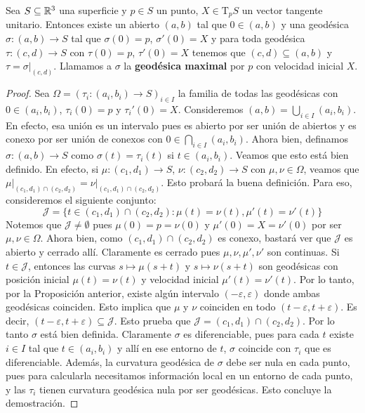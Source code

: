 \begin{prop}
Sea $S\subseteq\mathbb{R}^3$ una superficie y $p\in S$ un punto, $X\in\mathrm{T}_pS$ un vector tangente unitario. Entonces existe un abierto $(a,b)$ tal que $0\in (a,b)$ y una geodésica $\sigma:(a,b)\to S$ tal que $\sigma(0)=p$, $\sigma'(0)=X$ y para toda geodésica $\tau:(c,d)\to S$ con $\tau(0)=p$, $\tau'(0)=X$ tenemos que $(c,d)\subseteq (a,b)$ y $\tau=\left.\sigma\right\rvert_{(c,d)}$. Llamamos a $\sigma$ la \textbf{geodésica maximal} por $p$ con velocidad inicial $X$.
\begin{proof}
Sea $\Omega = (\tau_i : (a_i,b_i)\to S)_{i\in I}$ la familia de todas las geodésicas con $0\in (a_i,b_i)$, $\tau_i(0)=p$ y $\tau_i'(0)=X$. Consideremos $(a,b)=\displaystyle\bigcup_{i\in I}(a_i,b_i)$. En efecto, esa unión es un intervalo pues es abierto por ser unión de abiertos y es conexo por ser unión de conexos con $0\in\displaystyle\bigcap_{i\in I}(a_i,b_i)$. Ahora bien, definamos $\sigma:(a,b)\to S$ como $\sigma(t)=\tau_i(t)$ si $t\in(a_i,b_i)$. Veamos que esto está bien definido. En efecto, si $\mu:(c_1,d_1)\to S$, $\nu:(c_2,d_2)\to S$ con $\mu,\nu\in\Omega$, veamos que $\left.\mu\right\rvert_{(c_1,d_1)\cap(c_2,d_2)}=\left.\nu\right\rvert_{(c_1,d_1)\cap (c_2,d_2)}$. Esto probará la buena definición. Para eso, consideremos el siguiente conjunto: $$\mathscr{J} = \{t\in (c_1,d_1)\cap(c_2,d_2):\mu(t)=\nu(t), \mu'(t)=\nu'(t)\}$$ Notemos que $\mathscr{J}\neq\emptyset$ pues $\mu(0)=p=\nu(0)$ y $\mu'(0)=X=\nu'(0)$ por ser $\mu,\nu\in\Omega$. Ahora bien, como $(c_1,d_1)\cap(c_2,d_2)$ es conexo, bastará ver que $\mathscr{J}$ es abierto y cerrado allí. Claramente es cerrado pues $\mu,\nu,\mu',\nu'$ son continuas. Si $t\in\mathscr{J}$, entonces las curvas $s\mapsto\mu(s+t)$ y $s\mapsto\nu(s+t)$ son geodésicas con posición inicial $\mu(t)=\nu(t)$ y velocidad inicial $\mu'(t)=\nu'(t)$. Por lo tanto, por la Proposición anterior, existe algún intervalo $(-\varepsilon,\varepsilon)$ donde ambas geodésicas coinciden. Esto implica que $\mu$ y $\nu$ coinciden en todo $(t-\varepsilon,t+\varepsilon)$. Es decir, $(t-\varepsilon,t+\varepsilon)\subseteq\mathscr{J}$. Esto prueba que $\mathscr{J}=(c_1,d_1)\cap(c_2,d_2)$. Por lo tanto $\sigma$ está bien definida. Claramente $\sigma$ es diferenciable, pues para cada $t$ existe $i\in I$ tal que $t\in (a_i,b_i)$ y allí en ese entorno de $t$, $\sigma$ coincide con $\tau_i$ que es diferenciable. Además, la curvatura geodésica de $\sigma$ debe ser nula en cada punto, pues para calcularla necesitamos información local en un entorno de cada punto, y las $\tau_i$ tienen curvatura geodésica nula por ser geodésicas. Esto concluye la demostración.
\end{proof}
\end{prop}


